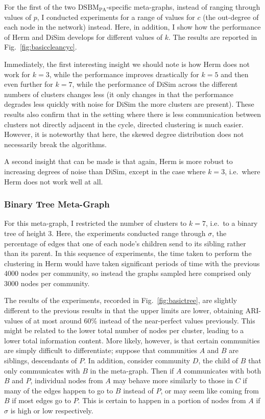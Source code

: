 For the first of the two $\mathrm{DSBM}_\mathrm{PA}$-specific meta-graphs, instead of ranging 
through values of $p$, I conducted experiments for a range of values for $c$ (the out-degree of 
each node in the network) instead. Here, in addition, I show how the performance of Herm and DiSim 
develops for different values of $k$. The results are reported in Fig.\ \ref{fig:basiccleancyc}.

Immediately, the first interesting insight we should note is how Herm does not work for $k=3$, 
while the performance improves drastically for $k=5$ and then even further for $k=7$, while the 
performance of DiSim across the different numbers of clusters changes less (it only changes in 
that the performance degrades less quickly with noise for DiSim the more clusters are present). 
These results also confirm that in the setting where there is less communication between clusters 
not directly adjacent in the cycle, directed clustering is much easier. However, it is noteworthy 
that here, the skewed degree distribution does not necessarily break the algorithms.

A second insight that can be made is that again, Herm is more robust to increasing degrees of 
noise than DiSim, except in the case where $k=3$, i.e.\ where Herm does not work well at all.

\subsubsection{Binary Tree Meta-Graph}

For this meta-graph, I restricted the number of clusters to $k=7$, i.e.\ to a binary tree of 
height 3. Here, the experiments conducted range through $\sigma$, the percentage of edges that one 
of each node's children send to its sibling rather than its parent. In this sequence of 
experiments, the time taken to perform the clustering in Herm would have taken significant periods 
of time with the previous 4000 nodes per community, so instead the graphs sampled here comprised 
only 3000 nodes per community.

The results of the experiments, recorded in Fig.\ \ref{fig:basictree}, are slightly different to 
the previous results in that the upper limits are lower, obtaining ARI-values of at most around 
60\% instead of the near-perfect values previously. This might be related to the lower total 
number of nodes per cluster, leading to a lower total information content. More likely, however, 
is that certain communities are simply difficult to differentiate; suppose that communities $A$ 
and $B$ are siblings, descendants of $P$. In addition, consider community $D$, the child of $B$ 
that only communicates with $B$ in the meta-graph. Then if $A$ communicates with both $B$ and $P
$,  individual nodes from $A$ may behave more similarly to those in $C$ if many of the edges 
happen to go to $B$ instead of $P$, or may seem like coming from $B$ if most edges go to $P$. This 
is certain to happen in a portion of nodes from $A$ if $\sigma$ is high or low respectively.

